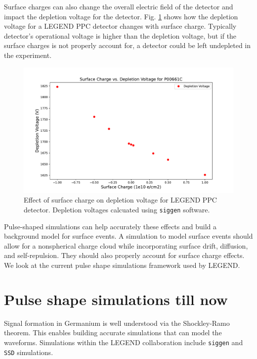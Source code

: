 Surface charges can also change the overall electric field of the detector and impact the depletion voltage for the detector. Fig. \ref{ch3_fig_deplection_sc} shows how the depletion voltage for a LEGEND PPC detector changes with surface charge. Typically detector's operational voltage is higher than the depletion voltage, but if the surface charges is not properly account for, a detector could be left undepleted in the experiment.

\begin{figure}[!htb]
\centering
  \includegraphics[width=0.99\linewidth]{ch3/figs/deplep_sc.pdf}
 \caption{Effect of surface charge on depletion voltage for LEGEND PPC detector. Depletion voltages calcuated using \texttt{siggen} software.}
\label{ch3_fig_deplection_sc}
  \end{figure}

Pulse-shaped simulations can help accurately these effects and build a background model for surface events. A simulation to model surface events should allow for a nonspherical charge cloud while incorporating surface drift, diffusion, and self-repulsion. They should also properly account for surface charge effects. We look at the current pulse shape simulations framework used by LEGEND.

\section{Pulse shape simulations till now}

Signal formation in Germanium is well understood via the Shockley-Ramo theorem. This enables building accurate simulations that can model the waveforms. Simulations within the LEGEND collaboration include \texttt{siggen} and \texttt{SSD} simulations. 

